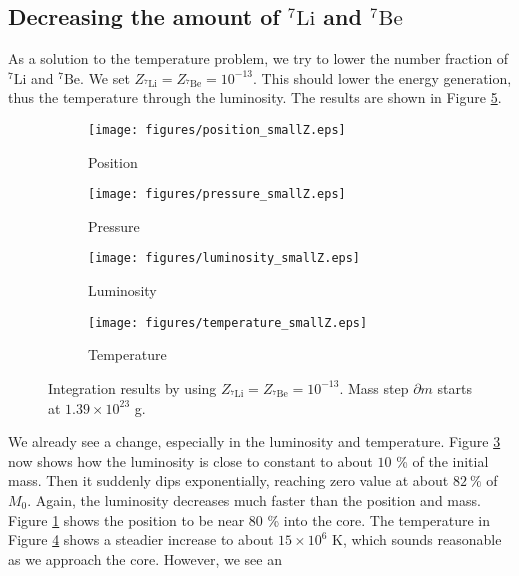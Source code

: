 \documentclass[a4paper, 11pt, english]{article}
\newcommand{\refig}[1]{\textcolor{blue}{\ref{fig:#1}}} %
\begin{document}
\subsection{Decreasing the amount of $^{7}\mathrm{Li}$ and $^{7}\mathrm{Be}$}

As a solution to the temperature problem, we try to lower the number fraction of
$^{7}\mathrm{Li}$ and $^{7}\mathrm{Be}$. We set $Z_{^{7}\mathrm{Li}} = Z_{^{7}\mathrm{Be}}
= 10^{-13}$. This should lower the energy generation, thus the temperature through the
luminosity. The results are shown in Figure \refig{smallZ}.
%
\begin{figure}[htpb]
	\begin{subfigure}{0.49\textwidth}
		\texttt{[image: figures/position\_smallZ.eps]}
		\caption{Position}
		\label{fig:position_smallZ}
	\end{subfigure}\hfill
	\begin{subfigure}{0.49\textwidth}
		\texttt{[image: figures/pressure\_smallZ.eps]}
		\caption{Pressure}
		\label{fig:pressure_smallZ}
	\end{subfigure}\hfill
	\vspace{0.35cm}
	\begin{subfigure}{0.49\textwidth}
		\texttt{[image: figures/luminosity\_smallZ.eps]}
		\caption{Luminosity}
		\label{fig:luminosity_smallZ}
	\end{subfigure}\hfill
	\begin{subfigure}{0.49\textwidth}
		\texttt{[image: figures/temperature\_smallZ.eps]}
		\caption{Temperature}
		\label{fig:temperature_smallZ}
	\end{subfigure}
	\vspace{0.2cm}
	\caption{Integration results by using $Z_{^{7}\mathrm{Li}} = Z_{^{7}\mathrm{Be}}
	= 10^{-13}$. Mass step $\partial m$ starts at $1.39 \times 10^{23}$ g.}
	\label{fig:smallZ}
\end{figure}
%
We already see a change, especially in the luminosity and temperature. Figure
\refig{luminosity_smallZ} now shows how the luminosity is close to constant to about
$10$ \% of the initial mass. Then it suddenly dips exponentially, reaching zero value at
about $82 \ \%$ of $M_0$. Again, the luminosity decreases much faster than the position and
mass. Figure \refig{position_smallZ} shows the position to be near $80$ \% into the core.
The temperature in Figure \refig{temperature_smallZ} shows a steadier increase to about
$15 \times 10^6$ K, which sounds reasonable as we approach the core. However, we see an
\end{document}
